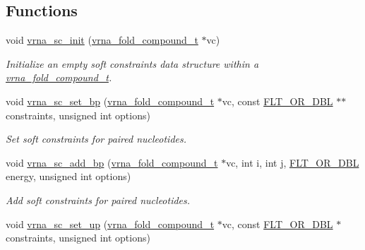 \subsection*{Functions}
\begin{DoxyCompactItemize}
\item 
void \mbox{\hyperlink{group__soft__constraints_ga9d977a1681356778cc66dceafbe5b032}{vrna\+\_\+sc\+\_\+init}} (\mbox{\hyperlink{group__fold__compound_ga1b0cef17fd40466cef5968eaeeff6166}{vrna\+\_\+fold\+\_\+compound\+\_\+t}} $\ast$vc)
\begin{DoxyCompactList}\small\item\em Initialize an empty soft constraints data structure within a \mbox{\hyperlink{group__fold__compound_ga1b0cef17fd40466cef5968eaeeff6166}{vrna\+\_\+fold\+\_\+compound\+\_\+t}}. \end{DoxyCompactList}\item 
void \mbox{\hyperlink{group__soft__constraints_ga8e4334b24bc91453fbcda490a4e331af}{vrna\+\_\+sc\+\_\+set\+\_\+bp}} (\mbox{\hyperlink{group__fold__compound_ga1b0cef17fd40466cef5968eaeeff6166}{vrna\+\_\+fold\+\_\+compound\+\_\+t}} $\ast$vc, const \mbox{\hyperlink{group__data__structures_ga31125aeace516926bf7f251f759b6126}{F\+L\+T\+\_\+\+O\+R\+\_\+\+D\+BL}} $\ast$$\ast$constraints, unsigned int options)
\begin{DoxyCompactList}\small\item\em Set soft constraints for paired nucleotides. \end{DoxyCompactList}\item 
void \mbox{\hyperlink{group__soft__constraints_gaf162aedac7422f2eb16ea030f47d2f4b}{vrna\+\_\+sc\+\_\+add\+\_\+bp}} (\mbox{\hyperlink{group__fold__compound_ga1b0cef17fd40466cef5968eaeeff6166}{vrna\+\_\+fold\+\_\+compound\+\_\+t}} $\ast$vc, int i, int j, \mbox{\hyperlink{group__data__structures_ga31125aeace516926bf7f251f759b6126}{F\+L\+T\+\_\+\+O\+R\+\_\+\+D\+BL}} energy, unsigned int options)
\begin{DoxyCompactList}\small\item\em Add soft constraints for paired nucleotides. \end{DoxyCompactList}\item 
void \mbox{\hyperlink{group__soft__constraints_ga99ed63f3ef9e7fe3997932030487a344}{vrna\+\_\+sc\+\_\+set\+\_\+up}} (\mbox{\hyperlink{group__fold__compound_ga1b0cef17fd40466cef5968eaeeff6166}{vrna\+\_\+fold\+\_\+compound\+\_\+t}} $\ast$vc, const \mbox{\hyperlink{group__data__structures_ga31125aeace516926bf7f251f759b6126}{F\+L\+T\+\_\+\+O\+R\+\_\+\+D\+BL}} $\ast$constraints, unsigned int options)
$$
\end{DoxyCompactItemize}
